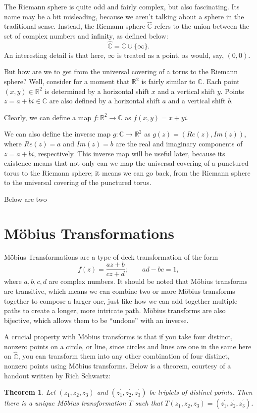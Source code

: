 \documentclass[12pt,a4paper,reqno,parskip=full]{amsart}
\numberwithin{equation}{section}
\theoremstyle{plain}
\newtheorem{theorem}[subsection]{Theorem}
\theoremstyle{definition}
\def\R{{\mathbb R}}
\def\C{{\mathbb C}}
\begin{document}

The Riemann sphere is quite odd and fairly complex, but also fascinating. Its name may be a bit misleading, because we aren't talking about a sphere in the traditional sense. Instead, the Riemann sphere $\hat\C$ refers to the union between the set of complex numbers and infinity, as defined below:
\[\hat\C=\C\cup\{\infty\}.\]
An interesting detail is that here, $\infty$ is treated as a point, as would, say, $(0,0)$. 

But how are we to get from the universal covering of a torus to the Riemann sphere? Well, consider for a moment that $\R^2$ is fairly similar to $\C$. Each point $(x,y)\in\R^2$ is determined by a horizontal shift $x$ and a vertical shift $y$. Points $z=a+bi\in\C$ are also defined by a horizontal shift $a$ and a vertical shift $b$. 

Clearly, we can define a map $f:\R^2\to\C$ as $f(x,y)=x+yi$.

We can also define the inverse map $g:\C\to\R^2$ as $g(z)=(Re(z),Im(z))$, where $Re(z)=a$ and $Im(z)=b$ are the real and imaginary components of $z=a+bi$, respectively. This inverse map will be useful later, because its existence means that not only can we map the universal covering of a punctured torus to the Riemann sphere; it means we can go back, from the Riemann sphere to the universal covering of the punctured torus.

Below are two 

\section{Möbius Transformations}

Möbius Transformations are a type of deck transformation of the form \[f(z)=\frac{az+b}{cz+d};\quad\quad ad-bc=1,\]
where $a,b,c,d$ are complex numbers. It should be noted that Möbius transforms are transitive, which means we can combine two or more Möbius transforms together to compose a larger one, just like how we can add together multiple paths to create a longer, more intricate path. Möbius transforms are also bijective, which allows them to be ``undone'' with an inverse.

A crucial property with Möbius transforms is that if you take four distinct, nonzero points on a circle, or line, since circles and lines are one in the same here on $\hat\C$, you can transform them into any other combination of four distinct, nonzero points using Möbius transforms. Below is a theorem, courtesy of a handout written by Rich Schwartz: %
\begin{theorem}Let $(z_1,z_2,z_3)$ and $(z_1^\prime,z_2^\prime,z_3^\prime)$ be triplets of distinct points. Then there is a unique Möbius transformation $T$ such that $T(z_1,z_2,z_3)=(z_1^\prime,z_2^\prime,z_3^\prime)$.
\end{theorem}
\end{document}
